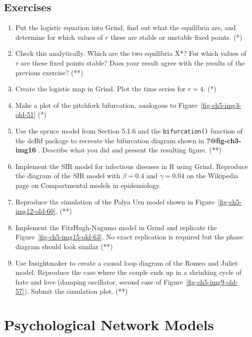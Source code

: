 \documentclass[
  letterpaper,
]{scrbook}
\begin{document}
\hypertarget{exercises-4}{%
\section{Exercises}\label{exercises-4}}

\begin{enumerate}
\def\labelenumi{\arabic{enumi})}
\item
  Put the logistic equation into Grind, find out what the equilibria
  are, and determine for which values of \(r\) these are stable or
  unstable fixed points. (*)
\item
  Check this analytically. Which are the two equilibria X*? For which
  values of \(r\) are these fixed points stable? Does your result agree
  with the results of the previous exercise? (**)
\item
  Create the logistic map in Grind. Plot the time series for \(r = 4\).
  (*)
\item
  Make a plot of the pitchfork bifurcation, analogous to
  Figure~\ref{fig-ch5-img3-old-51} (*)
\item
  Use the spruce model from Section 5.1.6 and the \texttt{bifurcation()}
  function of the deBif package to recreate the bifurcation diagram
  shown in \textbf{?@fig-ch3-img16} . Describe what you did and present
  the resulting figure. (**)
\item
  Implement the SIR model for infectious diseases in R using Grind.
  Reproduce the diagram of the SIR model with \(\beta = 0.4\) and
  \(\gamma = 0.04\) on the Wikipedia page on Compartmental models in
  epidemiology.
\item
  Reproduce the simulation of the Polya Urn model shown in
  Figure~\ref{fig-ch5-img12-old-60}. (**)
\item
  Implement the FitzHugh-Nagumo model in Grind and replicate the
  Figure~\ref{fig-ch5-img15-old-63}. No exact replication is required
  but the phase diagram should look similar (**)
\item
  Use Insightmaker to create a causal loop diagram of the Romeo and
  Juliet model. Reproduce the case where the couple ends up in a
  shrinking cycle of hate and love (damping oscillator, second case of
  Figure~\ref{fig-ch5-img9-old-57}). Submit the simulation plot. (**)
\end{enumerate}


\hypertarget{psychological-network-models}{%
\chapter{Psychological Network
Models}\label{psychological-network-models}}
\end{document}
